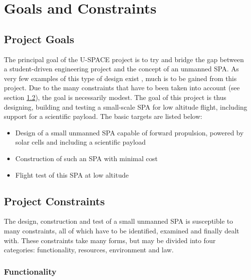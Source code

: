 \chapter{Goals and Constraints}
\label{chap:goals_constraints}

\section{Project Goals}
\label{sec:goals}

The principal goal of the \ac{U-SPACE} project is to try and bridge the gap between a student-driven engineering project and the concept of an unmanned \ac{SPA}. As very few examples of this type of design exist \cite{website:solr}, much is to be gained from this project. Due to the many constraints that have to been taken into account (see section \ref{sec:constraints}), the goal is necessarily modest. The goal of this project is thus designing, building and testing a small-scale \ac{SPA} for low altitude flight, including support for a scientific payload. The basic targets are listed below:

\begin{itemize}
\item Design of a small unmanned \ac{SPA} capable of forward propulsion, powered by solar cells and including a scientific payload
\item Construction of such an \ac{SPA} with minimal cost
\item Flight test of this \ac{SPA} at low altitude
\end{itemize}

\section{Project Constraints}
\label{sec:constraints}

The design, construction and test of a small unmanned \ac{SPA} is susceptible to many constraints, all of which have to be identified, examined and finally dealt with. These constraints take many forms, but may be divided into four categories: functionality, resources, environment and law.

\subsection{Functionality}

